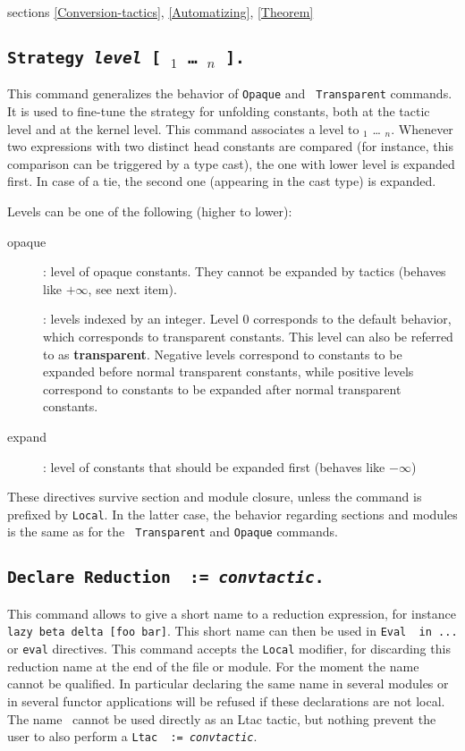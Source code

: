 \SeeAlso sections \ref{Conversion-tactics}, \ref{Automatizing},
\ref{Theorem}

\subsection{\tt Strategy {\it level} [ \qualid$_1$ {\dots} \qualid$_n$
  ].\label{Strategy}}
This command generalizes the behavior of {\tt Opaque} and {\tt
  Transparent} commands. It is used to fine-tune the strategy for
unfolding constants, both at the tactic level and at the kernel
level. This command associates a level to \qualid$_1$ {\dots}
\qualid$_n$. Whenever two expressions with two distinct head
constants are compared (for instance, this comparison can be triggered
by a type cast), the one with lower level is expanded first. In case
of a tie, the second one (appearing in the cast type) is expanded.

Levels can be one of the following (higher to lower):
\begin{description}
\item[opaque]: level of opaque constants. They cannot be expanded by
  tactics (behaves like $+\infty$, see next item).
\item[\num]: levels indexed by an integer. Level $0$ corresponds
  to the default behavior, which corresponds to transparent
  constants. This level can also be referred to as {\bf transparent}.
  Negative levels correspond to constants to be expanded before normal
  transparent constants, while positive levels correspond to constants
  to be expanded after normal transparent constants.
\item[expand]: level of constants that should be expanded first
  (behaves like $-\infty$)
\end{description}

These directives survive section and module closure, unless the
command is prefixed by {\tt Local}. In the latter case, the behavior
regarding sections and modules is the same as for the {\tt
  Transparent} and {\tt Opaque} commands.

\subsection{\tt Declare Reduction \ident\ := {\rm\sl convtactic}.}

This command allows to give a short name to a reduction expression,
for instance {\tt lazy beta delta [foo bar]}. This short name can
then be used in {\tt Eval \ident\ in ...} or {\tt eval} directives.
This command accepts the {\tt Local} modifier, for discarding
this reduction name at the end of the file or module. For the moment
the name cannot be qualified. In particular declaring the same name
in several modules or in several functor applications will be refused
if these declarations are not local. The name \ident\ cannot be used
directly as an Ltac tactic, but nothing prevent the user to also
perform a {\tt Ltac \ident\ := {\rm\sl convtactic}}.


